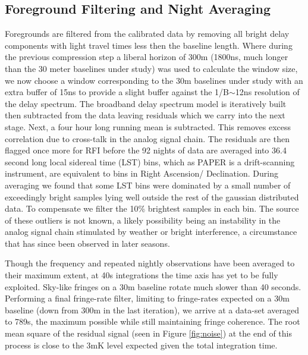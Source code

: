 \documentclass[preprint]{aastex}
\begin{document}
\subsection{Foreground Filtering and Night Averaging}
Foregrounds are filtered from the calibrated data by removing all bright delay components with light travel times less then the baseline length. Where during the previous compression step a liberal horizon of 300m (1800ns, much longer than the 30 meter baselines under study)  was used to calculate the window size, we now choose a window corresponding to the 30m baselines under study with an extra buffer of 15ns to provide a slight buffer against the 1/B$\sim$12ns resolution of the delay spectrum.  The broadband delay spectrum model is iteratively built then subtracted from the data leaving residuals which we carry into the next stage. Next, a four hour long running mean is subtracted. This removes excess correlation due to cross-talk in the analog signal chain. The residuals are then flagged once more for RFI before the 92 nights of data are averaged into 36.4 second long local sidereal time (LST) bins, which as PAPER is a drift-scanning instrument, are equivalent to bins in Right Ascension/ Declination.  During averaging we found that some LST bins were dominated by a small number of exceedingly bright samples lying well outside the rest of the gaussian distributed data. To compensate we filter the 10\% brightest samples in each bin.  The source of these outliers is not known,  a likely possibility being an instability in the analog signal chain stimulated by weather or bright interference, a circumstance that has since been observed in later seasons. 


Though the frequency and repeated nightly observations have been averaged to their maximum extent, at 40s integrations the time axis has yet to be fully exploited.  Sky-like fringes on a 30m baseline rotate much slower than 40 seconds.  Performing a final fringe-rate filter, limiting to fringe-rates expected on a 30m baseline (down from 300m in the last iteration), we arrive at a data-set averaged to 789s, the maximum possible while still maintaining fringe coherence.    The root mean square of the residual signal (seen in Figure \ref{fig:noise}) at the end of this process is close to the 3mK level expected given the total integration time.  

\end{document}
